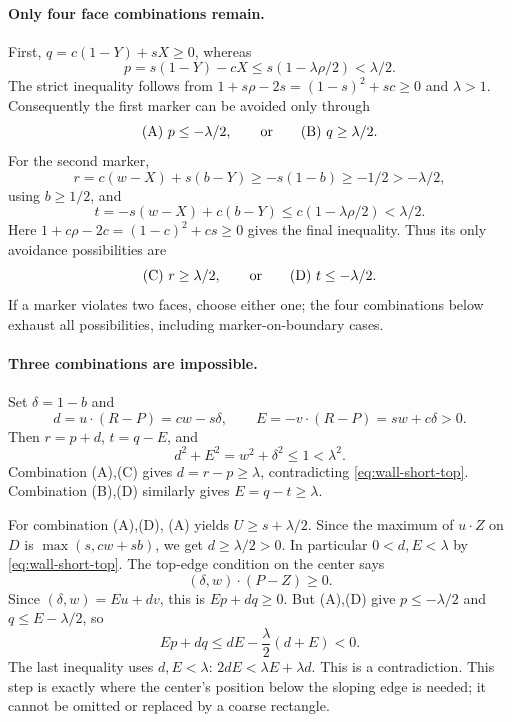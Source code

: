 \documentclass[11pt]{article}
\begin{document}
\paragraph{Only four face combinations remain.}
First, $q=c(1-Y)+sX\ge0$, whereas
\[
 p=s(1-Y)-cX\le s(1-\lambda\rho/2)<\lambda/2.
\]
The strict inequality follows from
$1+s\rho-2s=(1-s)^2+sc\ge0$ and $\lambda>1$.
Consequently the first marker can be avoided only through
\[
 \text{(A)}\ p\le-\lambda/2,
 \qquad\hbox{or}\qquad
 \text{(B)}\ q\ge\lambda/2.
\]
For the second marker,
\[
 r=c(w-X)+s(b-Y)\ge-s(1-b)\ge-1/2>-\lambda/2,
\]
using $b\ge1/2$, and
\[
 t=-s(w-X)+c(b-Y)\le c(1-\lambda\rho/2)<\lambda/2.
\]
Here $1+c\rho-2c=(1-c)^2+cs\ge0$ gives the final inequality.
Thus its only avoidance possibilities are
\[
 \text{(C)}\ r\ge\lambda/2,
 \qquad\hbox{or}\qquad
 \text{(D)}\ t\le-\lambda/2.
\]
If a marker violates two faces, choose either one; the four combinations
below exhaust all possibilities, including marker-on-boundary cases.

\paragraph{Three combinations are impossible.}
Set $\delta=1-b$ and
\[
 d=u\cdot(R-P)=cw-s\delta,
 \qquad E=-v\cdot(R-P)=sw+c\delta>0.
\]
Then $r=p+d$, $t=q-E$, and
\begin{equation}\label{eq:wall-short-top}
 d^2+E^2=w^2+\delta^2\le1<\lambda^2.
\end{equation}
Combination (A),(C) gives $d=r-p\ge\lambda$, contradicting
\eqref{eq:wall-short-top}. Combination (B),(D) similarly gives
$E=q-t\ge\lambda$.

For combination (A),(D), (A) yields $U\ge s+\lambda/2$.
Since the maximum of $u\cdot Z$ on $D$ is $\max(s,cw+sb)$,
we get $d\ge\lambda/2>0$. In particular $0<d,E<\lambda$ by
\eqref{eq:wall-short-top}. The top-edge condition on the center says
\[
 (\delta,w)\cdot(P-Z)\ge0.
\]
Since $(\delta,w)=E u+d v$, this is $Ep+dq\ge0$.
But (A),(D) give $p\le-\lambda/2$ and $q\le E-\lambda/2$, so
\[
 Ep+dq\le dE-\frac\lambda2(d+E)<0.
\]
The last inequality uses $d,E<\lambda$:
$2dE<\lambda E+\lambda d$. This is a contradiction.
This step is exactly where the center's position below the sloping edge
is needed; it cannot be omitted or replaced by a coarse rectangle.
\end{document}
